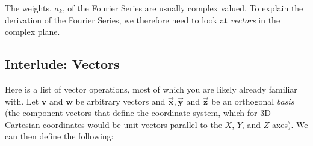 The weights, $a_k$, of the Fourier Series are usually complex valued. To explain the derivation of the Fourier Series, we therefore need to look at \emph{vectors} in the complex plane.

\subsection{Interlude: Vectors}

Here is a list of vector operations, most of which you are likely already familiar with. Let $\mathbf{v}$ and $\mathbf{w}$ be arbitrary vectors and
$\vec{\mathbf{x}}, \vec{\mathbf{y}}$ and $\vec{\mathbf{z}}$ be an
orthogonal \emph{basis} (the component vectors that define the
coordinate system, which for 3D Cartesian coordinates would be unit
vectors parallel to the $X$, $Y$, and $Z$ axes).  We can then define
the following:


